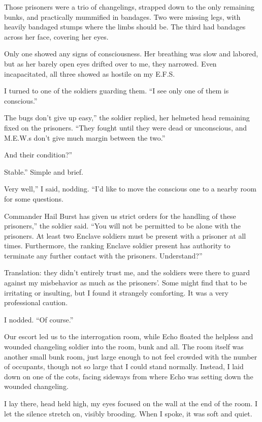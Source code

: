 Those prisoners were a trio of changelings, strapped down to the only remaining bunks, and practically mummified in bandages. Two were missing legs, with heavily bandaged stumps where the limbs should be. The third had bandages across her face, covering her eyes.

Only one showed any signs of consciousness. Her breathing was slow and labored, but as her barely open eyes drifted over to me, they narrowed. Even incapacitated, all three showed as hostile on my E.F.S.

I turned to one of the soldiers guarding them. “I see only one of them is conscious.”

\leavevmode{}The bugs don’t give up easy,” the soldier replied, her helmeted head remaining fixed on the prisoners. “They fought until they were dead or unconscious, and M.E.W.s don’t give much margin between the two.”

\leavevmode{}And their condition?”

\leavevmode{}Stable.” Simple and brief.

\leavevmode{}Very well,” I said, nodding. “I’d like to move the conscious one to a nearby room for some questions.

\leavevmode{}Commander Hail Burst has given us strict orders for the handling of these prisoners,” the soldier said. “You will not be permitted to be alone with the prisoners. At least two Enclave soldiers must be present with a prisoner at all times. Furthermore, the ranking Enclave soldier present has authority to terminate any further contact with the prisoners. Understand?”

Translation: they didn’t entirely trust me, and the soldiers were there to guard against my misbehavior as much as the prisoners’. Some might find that to be irritating or insulting, but I found it strangely comforting. It was a very professional caution.

I nodded. “Of course.”

Our escort led us to the interrogation room, while Echo floated the helpless and wounded changeling soldier into the room, bunk and all. The room itself was another small bunk room, just large enough to not feel crowded with the number of occupants, though not so large that I could stand normally. Instead, I laid down on one of the cots, facing sideways from where Echo was setting down the wounded changeling.

I lay there, head held high, my eyes focused on the wall at the end of the room. I let the silence stretch on, visibly brooding. When I spoke, it was soft and quiet.

